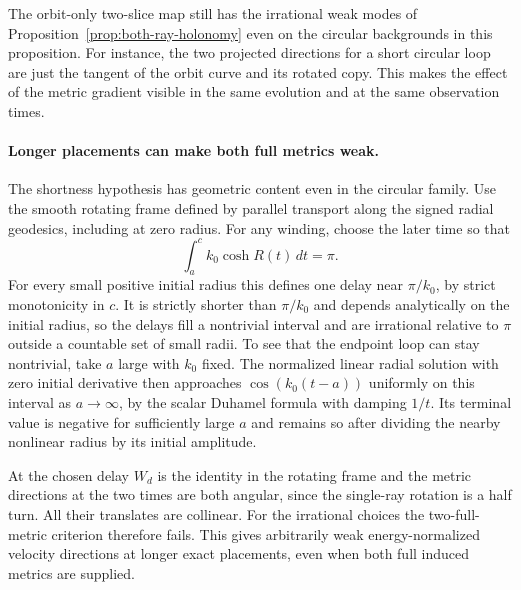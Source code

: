 The orbit-only two-slice map still has the irrational
weak modes of Proposition~\ref{prop:both-ray-holonomy}
even on the circular backgrounds in this proposition.
For instance, the two projected directions
for a short circular loop are just the tangent
of the orbit curve and its rotated copy.
This makes the effect of the metric gradient visible
in the same evolution and at the same observation times.

\paragraph{Longer placements can make both full metrics weak.}
The shortness hypothesis has geometric content even
in the circular family. Use the smooth rotating
frame defined by parallel transport along the signed
radial geodesics, including at zero radius.
For any winding, choose the later time so that
\[
  \int_a^c k_0\cosh R(t)\,dt=\pi .
\]
For every small positive initial radius this defines
one delay near $\pi/k_0$, by strict monotonicity
in $c$. It is strictly shorter than $\pi/k_0$ and
depends analytically on the initial radius, so the
delays fill a nontrivial interval and are irrational
relative to $\pi$ outside a countable set of small
radii. To see that the endpoint loop can stay
nontrivial, take $a$ large with $k_0$ fixed.
The normalized linear radial solution with zero
initial derivative then approaches
$\cos(k_0(t-a))$ uniformly on this interval
as $a\to\infty$, by the scalar Duhamel formula
with damping $1/t$. Its terminal value is negative
for sufficiently large $a$ and remains so after
dividing the nearby nonlinear radius by its
initial amplitude.

At the chosen delay $W_d$ is the identity in
the rotating frame and the metric directions
at the two times are both angular, since the
single-ray rotation is a half turn. All their
translates are collinear. For the irrational
choices the two-full-metric criterion therefore
fails. This gives arbitrarily weak energy-normalized
velocity directions at longer exact placements,
even when both full induced metrics are supplied.
